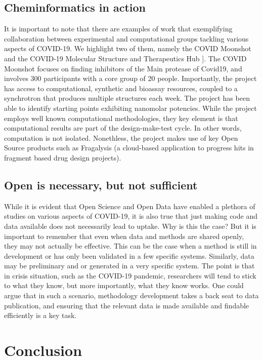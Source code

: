\documentclass{bmcart}
\begin{document}
\subsection*{Cheminformatics in action}
\label{sec:chem-acti}

It is important to note that there are examples of work that
exemplifying collaboration between experimental and computational
groups tackling various aspects of COVID-19. We highlight two of them,
namely the COVID Moonshot \cite{moonshot} and the COVID-19 Molecular
Structure and Therapeutics Hub \cite{molssi}]. The COVID Moonshot
focuses on finding inhibitors of the Main protease of Covid19, and
involves 300 participants with a core group of 20 people. Importantly,
the project has access to computational, synthetic and bioassay
resources, coupled to a synchrotron that produces multiple structures
each week. The project has been able to identify starting points
exhibiting nanomolar potencies. While the project employs well known
computational methodologies, they key element is that computational
results are part of the design-make-test cycle. In other words,
computation is not isolated. Nonethless, the project makes use of key
Open Source products such as Fragalysis (a cloud-based application to
progress hits in fragment based drug design projects).


\subsection*{Open is necessary, but not sufficient}

While it is evident that Open Science and Open Data have enabled a
plethora of studies on various aspects of COVID-19, it is also true
that just making code and data available does not necessarily lead to
uptake. Why is this the case?  But it is important to remember that
even when data and methods are shared openly, they may not actually be
effective. This can be the case when a method is still in development
or has only been validated in a few specific systems. Similarly, data
may be preliminary and or generated in a very specific system. The
point is that in crisis situation, such as the COVID-19 pandemic,
researchers will tend to stick to what they know, but more
importantly, what they know works. One could argue that in such a
scenario, methodology development takes a back seat to data
publication, and ensuring that the relevant data is made available and
findable efficiently is a key task.


\section*{Conclusion}
\end{document}
